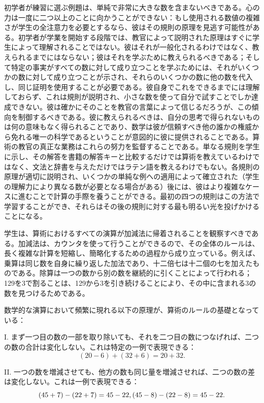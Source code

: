 \documentclass[a4paper,11pt,openany]{ltjsbook}
\begin{document}
初学者が練習に選ぶ例題は、単純で非常に大きな数を含まないべきである。心の力は一度に二つ以上のことに向かうことができない：もし使用される数値の複雑さが学生の全注意力を必要とするなら、彼はその規則の原理を見逃す可能性がある。初学者が学業を開始する段階では、教官によって説明された原理はすぐに学生によって理解されることではない。彼はそれが一般化されるわけではなく、教えられるまでにはならない；彼はそれを学ぶために教えられるべきである；そして特定の事実がすべての数に対して成り立つことを学ぶためには、それがいくつかの数に対して成り立つことが示され、それらのいくつかの数に他の数を代入し、同じ証明を使用することが必要である。彼自身でこれをできるまでには理解しておらず、これは規則が説明され、小さな数を使って自分で試すことでしか達成できない。彼は確かにそのことを教官の言葉によって信じるだろうが、この傾向を制御するべきである。彼に教えられるべきは、自分の思考で得られないものは何の意味もなく得られることであり、数学は彼が信頼すべき他の誰かの権威から免れる唯一の科学であるということが意図的に彼に提供されることである。算術の教官の真正な業務はこれらの努力を監督することである。単なる規則を学生に示し、その解答を書籍の解答キーと比較するだけでは算術を教えているわけではなく、文法と辞書を与えただけではラテン語を教えるわけでもない。各規則の原理が適切に説明され、いくつかの単純な例への適用によって確立された（学生の理解力により異なる数が必要となる場合がある）後には、彼はより複雑なケースに進むことで計算の手際を養うことができる。最初の四つの規則はこの方法で学習することができ、それらはその後の規則に対する最も明るい光を投げかけることになる。

学生は、算術におけるすべての演算が加減法に帰着されることを観察すべきである。加減法は、カウンタを使って行うことができるので、その全体のルールは、長く複雑な計算を短縮し、簡略化するための過程から成り立っている。例えば、乗算は同じ数を自身に繰り返した加法であり、十二倍七は十二個の七を加えたものである。除算は一つの数から別の数を継続的に引くことによって行われる；129を3で割ることは、129から3を引き続けることにより、その中に含まれる3の数を見つけるためである。

数学的な演算において頻繁に現れる以下の原理が、算術のルールの基礎となっている：

I. まず一つ目の数の一部を取り除いても、それを二つ目の数につなげれば、二つの数の合計は変化しない。これは特定の一例で表現できる：
\[
(20 - 6) + (32 + 6) = 20 + 32.
\]

II. 一つの数を増減させても、他方の数も同じ量を増減させれば、二つの数の差は変化しない。これは一例で表現できる：
\[
(45 + 7) - (22 + 7) = 45 - 22, \\
(45 - 8) - (22 - 8) = 45 - 22.
\]
\end{document}
